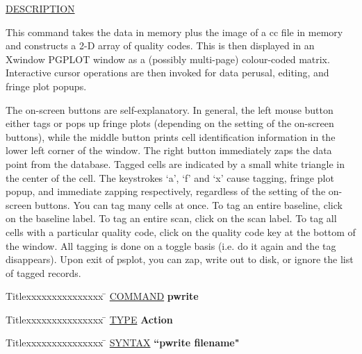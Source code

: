 \underline{DESCRIPTION}
\begin{list}{}{\setlength{\leftmargin}{0.5in}
     \setlength{\rightmargin}{0in}}
\item
This command takes the data in memory plus the image of a cc file in memory
and constructs a 2-D array of quality codes.  This is then displayed
in an Xwindow PGPLOT window as a (possibly multi-page) colour-coded
matrix.  Interactive cursor operations are then invoked for data
perusal, editing, and fringe plot popups.
\item
The on-screen buttons are self-explanatory.  In general, the left mouse
button either tags or pops up fringe plots (depending on the setting
of the on-screen buttons), while the middle button prints cell identification
information in the lower left corner of the window.  The right button
immediately zaps the data point from the database.  Tagged cells are
indicated by a small white triangle in the center of the cell.  The
keystrokes `a', `f' and `x' cause tagging, fringe plot popup, and
immediate zapping respectively, regardless of the setting of the on-screen
buttons.  You can tag many cells at once.  To tag an entire baseline,
click on the baseline label.  To tag an entire scan, click on the scan
label.  To tag all cells with a particular quality code, click on the
quality code key at the bottom of the window.  All tagging is done on
a toggle basis (i.e. do it again and the tag disappears).  Upon exit of
psplot, you can zap, write out to disk, or ignore the list of tagged
records.
\end{list}
\vspace{.2in}

\begin{tabbing}
Titlexxxxxxxxxxxxxxx \= \kill
\underline{COMMAND} \> {\bf 	pwrite} \\
\end{tabbing}

\begin{tabbing}
Titlexxxxxxxxxxxxxxx \= \kill
\underline{TYPE} \> {\bf 		Action} \\
\end{tabbing}

\begin{tabbing}
Titlexxxxxxxxxxxxxxx \= \kill
\underline{SYNTAX} \> {\bf 		``pwrite filename"} \\
\end{tabbing}

